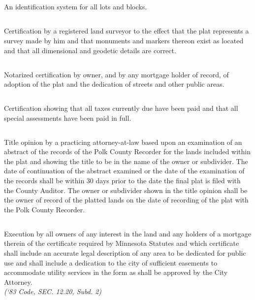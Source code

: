 \subsection{}
An identification system for all lots and blocks.
\subsection{}
Certification by a registered land surveyor to the effect that the plat represents a survey made by him and that monuments and markers thereon exist as located and that all dimensional and geodetic details are correct.
\subsection{}
Notarized certification by owner, and by any mortgage holder of record, of adoption of the plat and the dedication of streets and other public areas.
\subsection{}
Certification showing that all taxes currently due have been paid and that all special assessments have been paid in full.
\subsection{}
Title opinion by a practicing attorney-at-law based upon an examination of an abstract of the records of the Polk County Recorder for the lands included within the plat and showing the title to be in the name of the owner or subdivider. The date of continuation of the abstract examined or the date of the examination of the records shall be within 30 days prior to the date the final plat is filed with the County Auditor. The owner or subdivider shown in the title opinion shall be the owner of record of the platted lands on the date of recording of the plat with the Polk County Recorder.
\subsection{}
Execution by all owners of any interest in the land and any holders of a mortgage therein of the certificate required by Minnesota Statutes and which certificate shall include an accurate legal description of any area to be dedicated for public use and shall include a dedication to the city of sufficient easements to accommodate utility services in the form as shall be approved by the City Attorney.\\
\emph{(‘83 Code, SEC. 12.20, Subd. 2)}
